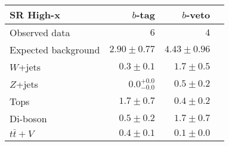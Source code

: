 \begin{tabular*}{\textwidth}{@{\extracolsep{\fill}}lrrr}
\toprule
\textbf{SR High-x} & $b$-tag & $b$-veto \\
\midrule

Observed data & $6$ & $4$ \\
\midrule
Expected background & $2.90 \pm 0.77$ & $4.43 \pm 0.96$ \\
\midrule
$W$+jets & $0.3 \pm 0.1$ & $1.7 \pm 0.5$ \\
$Z$+jets & $0.0_{-0.0}^{+0.0}$ & $0.5 \pm 0.2$ \\
Tops & $1.7 \pm 0.7$ & $0.4 \pm 0.2$ \\
Di-boson & $0.5 \pm 0.2$ & $1.7 \pm 0.7$ \\
$t\bar{t}+V$ & $0.4 \pm 0.1$ & $0.1 \pm 0.0$ \\


\bottomrule
\end{tabular*}




